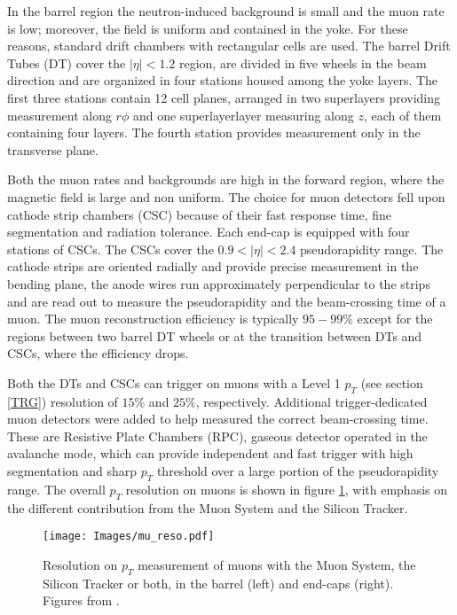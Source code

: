 In the barrel region the neutron-induced background is small and the muon
rate is low; moreover, the field is uniform and contained in the yoke. For these
reasons, standard drift chambers with rectangular cells are used. The barrel Drift
Tubes (DT) cover the $|\eta|<1.2$ region, are divided in five wheels in the beam direction and are organized in four stations housed among the yoke layers.
The first three stations contain 12 cell planes, arranged in two superlayers providing measurement along $r\phi$ and one superlayerlayer measuring along $z$, each of them containing four layers.
The fourth station provides measurement only in the transverse plane.

Both the muon rates and backgrounds are high in the forward region, where
the magnetic field is large and non uniform. The choice for muon detectors fell
upon cathode strip chambers (CSC) because of their fast response time, fine segmentation 
and radiation tolerance. Each end-cap is equipped with four stations
of CSCs. The CSCs cover the $0.9<|\eta|<2.4$ pseudorapidity range. The cathode 
strips are oriented radially and provide precise measurement in the bending
plane, the anode wires run approximately perpendicular to the strips and are read
out to measure the pseudorapidity and the beam-crossing time of a muon. The
muon reconstruction efficiency is typically $95-99\%$ except for the regions between
two barrel DT wheels or at the transition between DTs and CSCs, where the
efficiency drops.

Both the DTs and CSCs can trigger on muons with a Level 1 $p_T$ (see section \ref{TRG}) resolution
of $15\%$ and $25\%$, respectively. Additional trigger-dedicated muon detectors were
added to help measured the correct beam-crossing time. These are Resistive Plate
Chambers (RPC), gaseous detector operated in the avalanche mode, which can
provide independent and fast trigger with high segmentation and sharp $p_T$ threshold 
over a large portion of the pseudorapidity range. The overall $p_T$ resolution on
muons is shown in figure \ref{mu_reso}, with emphasis on the different contribution from the
Muon System and the Silicon Tracker.
\begin{figure}
\centering
\texttt{[image: Images/mu\_reso.pdf]}
\caption{Resolution on $p_T$ measurement of muons with the Muon System, the
Silicon Tracker or both, in the barrel (left) and end-caps (right). Figures from \cite{CMS}.}
\label{mu_reso}
\end{figure}

